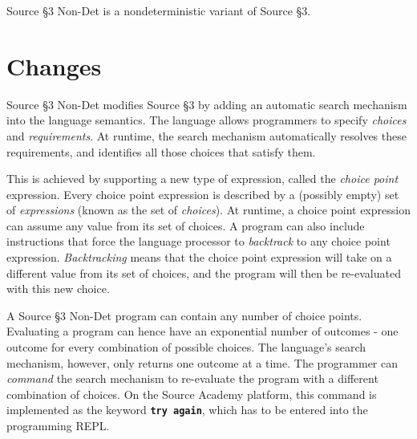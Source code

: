 





Source \S 3 Non-Det is a nondeterministic variant of Source \S 3.

\section*{Changes}

Source \S 3 Non-Det modifies Source \S 3 by adding an automatic search mechanism into the language semantics. The language allows programmers to specify \emph{choices} and \emph{requirements}. At runtime, the search mechanism automatically resolves these requirements, and identifies all those choices that satisfy them. \newline

This is achieved by supporting a new type of expression, called the \emph{choice point} expression. Every choice point expression is described by a (possibly empty) set of \emph{expressions} (known as the set of \emph{choices}). At runtime, a choice point expression can assume any value from its set of choices. A program can also include instructions that force the language processor to \emph{backtrack} to any choice point expression. \emph{Backtracking} means that the choice point expression will take on a different value from its set of choices, and the program will then be re-evaluated with this new choice. \newline

A Source \S 3 Non-Det program can contain any number of choice points. Evaluating a program can hence have an exponential number of outcomes - one outcome for every combination of possible choices. The language's search mechanism, however, only returns one outcome at a time. The programmer can \emph{command} the search mechanism to re-evaluate the program with a different combination of choices. On the Source Academy platform, this command is implemented as the keyword
\textbf{\texttt{try again}}, which has to be entered into the programming REPL.




\newpage



\newpage

